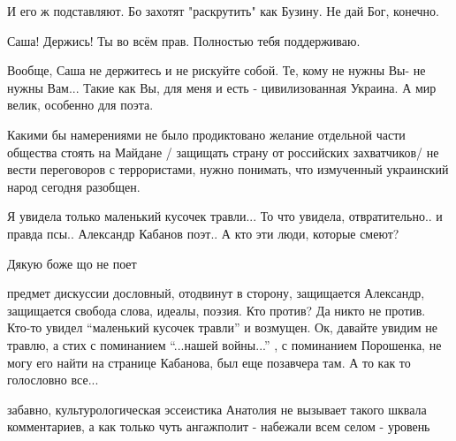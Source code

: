 \begin{itemize}
\begin{itemize} %
И его ж подставляют. Бо захотят "раскрутить" как Бузину. Не дай Бог, конечно.
\end{itemize} %

Саша! Держись! Ты во всём прав. Полностью тебя поддерживаю.


Вообще, Саша не держитесь и не рискуйте собой. Те, кому не нужны Вы- не нужны
Вам... Такие как Вы, для меня и есть - цивилизованная Украина. А мир велик,
особенно для поэта.



Какими бы намерениями не было продиктовано желание отдельной части общества
стоять на Майдане / защищать страну от российских захватчиков/ не вести
переговоров с террористами, нужно понимать, что измученный украинский народ
сегодня разобщен.


Я увидела только маленький кусочек травли...
То что увидела, отвратительно.. и правда псы..
Александр Кабанов поэт..
А кто эти люди, которые смеют?

Дякую боже що не поет


предмет дискуссии дословный, отодвинут в сторону, защищается Александр,
защищается свобода слова, идеалы, поэзия. Кто против? Да никто не против.
Кто-то увидел \enquote{маленький кусочек травли} и возмущен. Ок, давайте увидим не
травлю, а стих с поминанием \enquote{...нашей войны...} , с поминанием Порошенка, не
могу его найти на странице Кабанова, был еще позавчера там. А то как то
голословно все...


забавно, культурологическая эссеистика Анатолия не вызывает такого шквала
комментариев, а как только чуть ангажполит - набежали всем селом - уровень


\end{itemize} %
